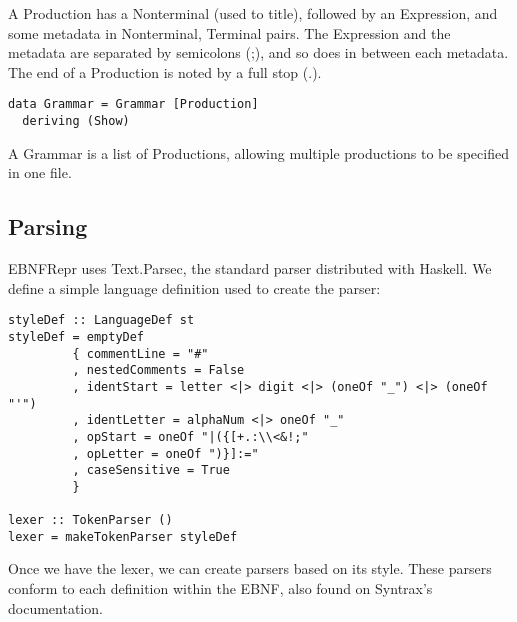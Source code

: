 \documentclass[a4paper]{article}
\begin{document}
A Production has a Nonterminal (used to title), followed by an Expression, and some metadata in Nonterminal, Terminal pairs. The Expression and the metadata are separated by semicolons (;), and so does in between each metadata. The end of a Production is noted by a full stop (.).

\begin{verbatim}
data Grammar = Grammar [Production]
  deriving (Show)
\end{verbatim}

A Grammar is a list of Productions, allowing multiple productions to be specified in one file.

\subsection{Parsing}
EBNFRepr uses Text.Parsec, the standard parser distributed with Haskell. We define a simple language definition used to create the parser:

\begin{verbatim}
styleDef :: LanguageDef st
styleDef = emptyDef
         { commentLine = "#"
         , nestedComments = False
         , identStart = letter <|> digit <|> (oneOf "_") <|> (oneOf "'") 
         , identLetter = alphaNum <|> oneOf "_"
         , opStart = oneOf "|({[+.:\\<&!;"
         , opLetter = oneOf ")}]:="
         , caseSensitive = True
         }

lexer :: TokenParser ()  
lexer = makeTokenParser styleDef
\end{verbatim}

Once we have the lexer, we can create parsers based on its style. These parsers conform to each definition within the EBNF, also found on Syntrax's documentation.
\end{document}
